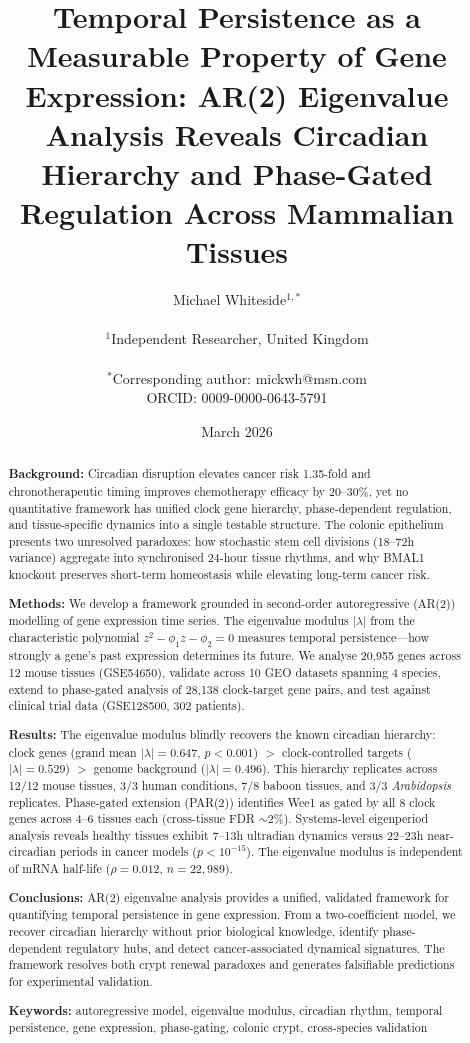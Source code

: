 \documentclass[11pt,letterpaper]{article}
\title{\textbf{Temporal Persistence as a Measurable Property of Gene Expression: AR(2) Eigenvalue Analysis Reveals Circadian Hierarchy and Phase-Gated Regulation Across Mammalian Tissues}}
\author{
Michael Whiteside$^{1,*}$ \\
\\
$^1$Independent Researcher, United Kingdom \\
\\
$^*$Corresponding author: mickwh@msn.com \\
ORCID: 0009-0000-0643-5791
}
\date{March 2026}
\begin{document}
\maketitle

\begin{abstract}
\noindent\textbf{Background:} Circadian disruption elevates cancer risk 1.35-fold and chronotherapeutic timing improves chemotherapy efficacy by 20--30\%, yet no quantitative framework has unified clock gene hierarchy, phase-dependent regulation, and tissue-specific dynamics into a single testable structure. The colonic epithelium presents two unresolved paradoxes: how stochastic stem cell divisions (18--72h variance) aggregate into synchronised 24-hour tissue rhythms, and why BMAL1 knockout preserves short-term homeostasis while elevating long-term cancer risk.

\noindent\textbf{Methods:} We develop a framework grounded in second-order autoregressive (AR(2)) modelling of gene expression time series. The eigenvalue modulus $|\lambda|$ from the characteristic polynomial $z^2 - \phi_1 z - \phi_2 = 0$ measures temporal persistence---how strongly a gene's past expression determines its future. We analyse 20,955 genes across 12 mouse tissues (GSE54650), validate across 10 GEO datasets spanning 4 species, extend to phase-gated analysis of 28,138 clock-target gene pairs, and test against clinical trial data (GSE128500, 302 patients).

\noindent\textbf{Results:} The eigenvalue modulus blindly recovers the known circadian hierarchy: clock genes (grand mean $|\lambda| = 0.647$, $p < 0.001$) $>$ clock-controlled targets ($|\lambda| = 0.529$) $>$ genome background ($|\lambda| = 0.496$). This hierarchy replicates across 12/12 mouse tissues, 3/3 human conditions, 7/8 baboon tissues, and 3/3 \textit{Arabidopsis} replicates. Phase-gated extension (PAR(2)) identifies Wee1 as gated by all 8 clock genes across 4--6 tissues each (cross-tissue FDR $\sim$2\%). Systems-level eigenperiod analysis reveals healthy tissues exhibit 7--13h ultradian dynamics versus 22--23h near-circadian periods in cancer models ($p < 10^{-15}$). The eigenvalue modulus is independent of mRNA half-life ($\rho = 0.012$, $n = 22{,}989$).

\noindent\textbf{Conclusions:} AR(2) eigenvalue analysis provides a unified, validated framework for quantifying temporal persistence in gene expression. From a two-coefficient model, we recover circadian hierarchy without prior biological knowledge, identify phase-dependent regulatory hubs, and detect cancer-associated dynamical signatures. The framework resolves both crypt renewal paradoxes and generates falsifiable predictions for experimental validation.

\noindent\textbf{Keywords:} autoregressive model, eigenvalue modulus, circadian rhythm, temporal persistence, gene expression, phase-gating, colonic crypt, cross-species validation
\end{abstract}
\end{document}
